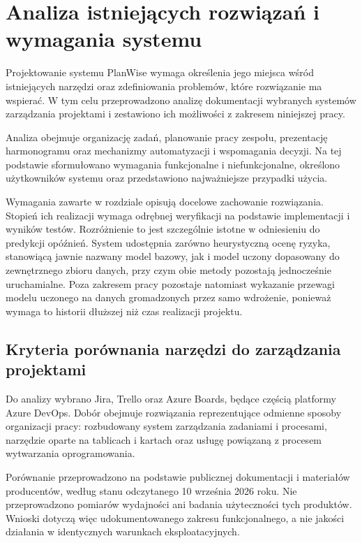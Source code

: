 \chapter{Analiza istniejących rozwiązań i wymagania systemu}
\label{chap:analiza-i-wymagania}

Projektowanie systemu PlanWise wymaga określenia jego miejsca wśród istniejących narzędzi oraz zdefiniowania problemów, które rozwiązanie ma wspierać. W tym celu przeprowadzono analizę dokumentacji wybranych systemów zarządzania projektami i zestawiono ich możliwości z zakresem niniejszej pracy.

Analiza obejmuje organizację zadań, planowanie pracy zespołu, prezentację harmonogramu oraz mechanizmy automatyzacji i wspomagania decyzji. Na tej podstawie sformułowano wymagania funkcjonalne i niefunkcjonalne, określono użytkowników systemu oraz przedstawiono najważniejsze przypadki użycia.

Wymagania zawarte w rozdziale opisują docelowe zachowanie rozwiązania. Stopień ich realizacji wymaga odrębnej weryfikacji na podstawie implementacji i wyników testów. Rozróżnienie to jest szczególnie istotne w odniesieniu do predykcji opóźnień. System udostępnia zarówno heurystyczną ocenę ryzyka, stanowiącą jawnie nazwany model bazowy, jak i model uczony dopasowany do zewnętrznego zbioru danych, przy czym obie metody pozostają jednocześnie uruchamialne. Poza zakresem pracy pozostaje natomiast wykazanie przewagi modelu uczonego na danych gromadzonych przez samo wdrożenie, ponieważ wymaga to historii dłuższej niż czas realizacji projektu.


\section{Kryteria porównania narzędzi do zarządzania projektami}
\label{sec:kryteria-porownania}

Do analizy wybrano Jira, Trello oraz Azure Boards, będące częścią platformy Azure DevOps. Dobór obejmuje rozwiązania reprezentujące odmienne sposoby organizacji pracy: rozbudowany system zarządzania zadaniami i procesami, narzędzie oparte na tablicach i kartach oraz usługę powiązaną z procesem wytwarzania oprogramowania.

Porównanie przeprowadzono na podstawie publicznej dokumentacji i materiałów producentów, według stanu odczytanego 10 września 2026 roku. Nie przeprowadzono pomiarów wydajności ani badania użyteczności tych produktów. Wnioski dotyczą więc udokumentowanego zakresu funkcjonalnego, a nie jakości działania w identycznych warunkach eksploatacyjnych.

